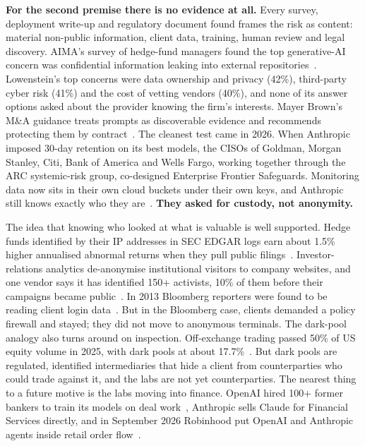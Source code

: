 \documentclass[10pt,a4paper]{article}
\begin{document}
\textbf{For the second premise there is no evidence at all.} Every survey, deployment write-up and regulatory document found frames the risk as content: material non-public information, client data, training, human review and legal discovery. AIMA's survey of hedge-fund managers found the top generative-AI concern was confidential information leaking into external repositories~\cite{aima-hedge-funds-and}. Lowenstein's top concerns were data ownership and privacy (42\%), third-party cyber risk (41\%) and the cost of vetting vendors (40\%), and none of its answer options asked about the provider knowing the firm's interests. Mayer Brown's M\&A guidance treats prompts as discoverable evidence and recommends protecting them by contract~\cite{mayer-brown-m-a}. The cleanest test came in 2026. When Anthropic imposed 30-day retention on its best models, the CISOs of Goldman, Morgan Stanley, Citi, Bank of America and Wells Fargo, working together through the ARC systemic-risk group, co-designed Enterprise Frontier Safeguards. Monitoring data now sits in their own cloud buckets under their own keys, and Anthropic still knows exactly who they are~\cite{anthropic-enterprise-front}. \textbf{They asked for custody, not anonymity.}

The idea that knowing who looked at what is valuable is well supported. Hedge funds identified by their IP addresses in SEC EDGAR logs earn about 1.5\% higher annualised abnormal returns when they pull public filings~\cite{management-science}. Investor-relations analytics de-anonymise institutional visitors to company websites, and one vendor says it has identified 150+ activists, 10\% of them before their campaigns became public~\cite{irwin}. In 2013 Bloomberg reporters were found to be reading client login data~\cite{cnbc-jpmorgan-and-bloomber}. But in the Bloomberg case, clients demanded a policy firewall and stayed; they did not move to anonymous terminals. The dark-pool analogy also turns around on inspection. Off-exchange trading passed 50\% of US equity volume in 2025, with dark pools at about 17.7\%~\cite{cboe-2025-us-equities}. But dark pools are regulated, identified intermediaries that hide a client from counterparties who could trade against it, and the labs are not yet counterparties. The nearest thing to a future motive is the labs moving into finance. OpenAI hired 100+ former bankers to train its models on deal work~\cite{sherwood-news-openai-and}, Anthropic sells Claude for Financial Services directly, and in September 2026 Robinhood put OpenAI and Anthropic agents inside retail order flow~\cite{fortune-robinhood-agents}.
\end{document}
